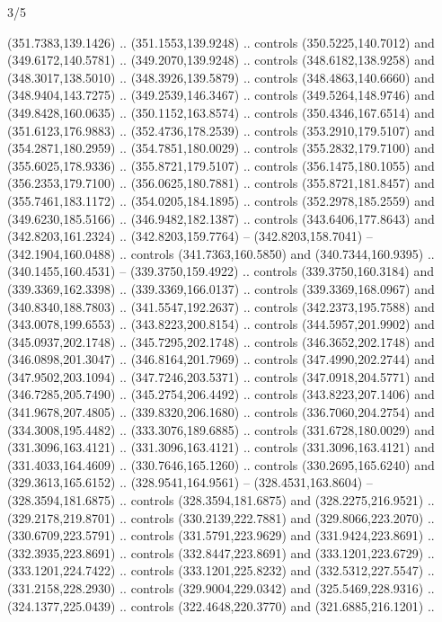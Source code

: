 \begin{flagdescription}{3/5}
\begin{scope}[xshift=0.5\flaglength,yshift=0.5\flagwidth,scale=\flagwidth/270]
\begin{scope}[y=0.8pt, x=0.8pt, yscale=-1,shift={(-281.25,-168.75)}]
  (351.7383,139.1426) .. (351.1553,139.9248) .. controls (350.5225,140.7012) and
  (349.6172,140.5781) .. (349.2070,139.9248) .. controls (348.6182,138.9258) and
  (348.3017,138.5010) .. (348.3926,139.5879) .. controls (348.4863,140.6660) and
  (348.9404,143.7275) .. (349.2539,146.3467) .. controls (349.5264,148.9746) and
  (349.8428,160.0635) .. (350.1152,163.8574) .. controls (350.4346,167.6514) and
  (351.6123,176.9883) .. (352.4736,178.2539) .. controls (353.2910,179.5107) and
  (354.2871,180.2959) .. (354.7851,180.0029) .. controls (355.2832,179.7100) and
  (355.6025,178.9336) .. (355.8721,179.5107) .. controls (356.1475,180.1055) and
  (356.2353,179.7100) .. (356.0625,180.7881) .. controls (355.8721,181.8457) and
  (355.7461,183.1172) .. (354.0205,184.1895) .. controls (352.2978,185.2559) and
  (349.6230,185.5166) .. (346.9482,182.1387) .. controls (343.6406,177.8643) and
  (342.8203,161.2324) .. (342.8203,159.7764) -- (342.8203,158.7041) --
  (342.1904,160.0488) .. controls (341.7363,160.5850) and (340.7344,160.9395) ..
  (340.1455,160.4531) -- (339.3750,159.4922) .. controls (339.3750,160.3184) and
  (339.3369,162.3398) .. (339.3369,166.0137) .. controls (339.3369,168.0967) and
  (340.8340,188.7803) .. (341.5547,192.2637) .. controls (342.2373,195.7588) and
  (343.0078,199.6553) .. (343.8223,200.8154) .. controls (344.5957,201.9902) and
  (345.0937,202.1748) .. (345.7295,202.1748) .. controls (346.3652,202.1748) and
  (346.0898,201.3047) .. (346.8164,201.7969) .. controls (347.4990,202.2744) and
  (347.9502,203.1094) .. (347.7246,203.5371) .. controls (347.0918,204.5771) and
  (346.7285,205.7490) .. (345.2754,206.4492) .. controls (343.8223,207.1406) and
  (341.9678,207.4805) .. (339.8320,206.1680) .. controls (336.7060,204.2754) and
  (334.3008,195.4482) .. (333.3076,189.6885) .. controls (331.6728,180.0029) and
  (331.3096,163.4121) .. (331.3096,163.4121) .. controls (331.3096,163.4121) and
  (331.4033,164.4609) .. (330.7646,165.1260) .. controls (330.2695,165.6240) and
  (329.3613,165.6152) .. (328.9541,164.9561) -- (328.4531,163.8604) --
  (328.3594,181.6875) .. controls (328.3594,181.6875) and (328.2275,216.9521) ..
  (329.2178,219.8701) .. controls (330.2139,222.7881) and (329.8066,223.2070) ..
  (330.6709,223.5791) .. controls (331.5791,223.9629) and (331.9424,223.8691) ..
  (332.3935,223.8691) .. controls (332.8447,223.8691) and (333.1201,223.6729) ..
  (333.1201,224.7422) .. controls (333.1201,225.8232) and (332.5312,227.5547) ..
  (331.2158,228.2930) .. controls (329.9004,229.0342) and (325.5469,228.9316) ..
  (324.1377,225.0439) .. controls (322.4648,220.3770) and (321.6885,216.1201) ..

\end{scope}
\end{scope}
\end{flagdescription}
